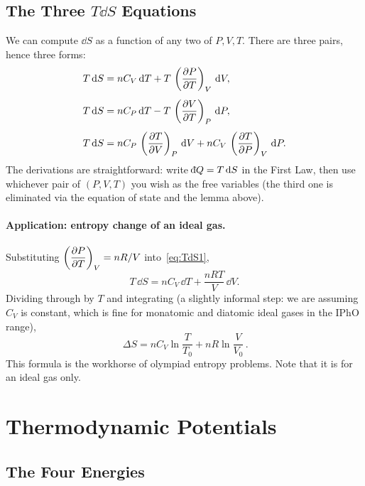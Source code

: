 \subsection{The Three $T\dd S$ Equations}

We can compute $\dd S$ as a function of any two of $P,V,T$. There are three pairs, hence three forms:
\begin{align}
    T\,\mathrm{d} S &= n C_V\,\mathrm{d} T + T\,\left(\dfrac{\partial P}{\partial T}\right)_V\,\mathrm{d} V, \label{eq:TdS1}\\[4pt]
    T\,\mathrm{d} S &= n C_P\,\mathrm{d} T - T\,\left(\dfrac{\partial V}{\partial T}\right)_P\,\mathrm{d} P, \label{eq:TdS2}\\[4pt]
    T\,\mathrm{d} S &= n C_P\,\left(\dfrac{\partial T}{\partial V}\right)_P\,\mathrm{d} V + n C_V\,\left(\dfrac{\partial T}{\partial P}\right)_V\,\mathrm{d} P. \label{eq:TdS3}
\end{align}
The derivations are straightforward: write $\dbar Q = T\,\dd S$ in the First Law, then use whichever pair of $(P,V,T)$ you wish as the free variables (the third one is eliminated via the equation of state and the lemma above).

\paragraph{Application: entropy change of an ideal gas.}
Substituting $\left(\dfrac{\partial P}{\partial T}\right)_V = nR/V$ into~\eqref{eq:TdS1},
\[
    T\,\dd S = n C_V\,\dd T + \frac{nRT}{V}\,\dd V.
\]
Dividing through by $T$ and integrating (a slightly informal step: we are assuming $C_V$ is constant, which is fine for monatomic and diatomic ideal gases in the IPhO range),
\[
    \boxed{\,\Delta S = n C_V \ln\!\frac{T}{T_0} + nR \ln\!\frac{V}{V_0}\,}.
\]
This formula is the workhorse of olympiad entropy problems. Note that it is for an ideal gas only.


\section{Thermodynamic Potentials}

\subsection{The Four Energies}

